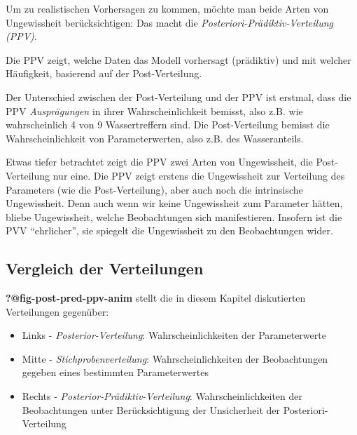 \documentclass[
  a4paper,
  DIV=11]{scrreprt}
\providecommand{\tightlist}{%
  \setlength{\itemsep}{0pt}\setlength{\parskip}{0pt}}\usepackage{longtable,booktabs,array}
\theoremstyle{definition}
\theoremstyle{remark}
\begin{document}
Um zu realistischen Vorhersagen zu kommen, möchte man beide Arten von
Ungewissheit berücksichtigen: Das macht die
\emph{Posteriori-Prädiktiv-Verteilung (PPV)}.

Die PPV zeigt, welche Daten das Modell vorhersagt (prädiktiv) und mit
welcher Häufigkeit, basierend auf der Post-Verteilung.

\begin{tcolorbox}[enhanced jigsaw, title=\textcolor{quarto-callout-note-color}{\faInfo}\hspace{0.5em}{Hinweis}, bottomtitle=1mm, bottomrule=.15mm, titlerule=0mm, colbacktitle=quarto-callout-note-color!10!white, colframe=quarto-callout-note-color-frame, leftrule=.75mm, left=2mm, toprule=.15mm, colback=white, arc=.35mm, breakable, toptitle=1mm, opacityback=0, rightrule=.15mm, coltitle=black, opacitybacktitle=0.6]

Der Unterschied zwischen der Post-Verteilung und der PPV ist erstmal,
dass die PPV \emph{Ausprägungen} in ihrer Wahrscheinlichkeit bemisst,
also z.B. wie wahrscheinlich 4 von 9 Wassertreffern sind. Die
Post-Verteilung bemisst die Wahrscheinlichkeit von Parameterwerten, also
z.B. des Wasseranteils.

Etwas tiefer betrachtet zeigt die PPV zwei Arten von Ungewissheit, die
Post-Verteilung nur eine. Die PPV zeigt erstens die Ungewissheit zur
Verteilung des Parameters (wie die Post-Verteilung), aber auch noch die
intrinsische Ungewissheit. Denn auch wenn wir keine Ungewissheit zum
Parameter hätten, bliebe Ungewissheit, welche Beobachtungen sich
manifestieren. Insofern ist die PVV ``ehrlicher'', sie spiegelt die
Ungewissheit zu den Beobachtungen wider.

\end{tcolorbox}

\hypertarget{vergleich-der-verteilungen}{%
\subsection{Vergleich der
Verteilungen}\label{vergleich-der-verteilungen}}

\textbf{?@fig-post-pred-ppv-anim} stellt die in diesem Kapitel
diskutierten Verteilungen gegenüber:

\begin{itemize}
\tightlist
\item
  Links - \emph{Posterior-Verteilung}: Wahrscheinlichkeiten der
  Parameterwerte
\item
  Mitte - \emph{Stichprobenverteilung}: Wahrscheinlichkeiten der
  Beobachtungen gegeben eines bestimmten Parameterwertes
\item
  Rechts - \emph{Posterior-Prädiktiv-Verteilung}: Wahrscheinlichkeiten
  der Beobachtungen unter Berücksichtigung der Unsicherheit der
  Posteriori-Verteilung
\end{itemize}
\end{document}
